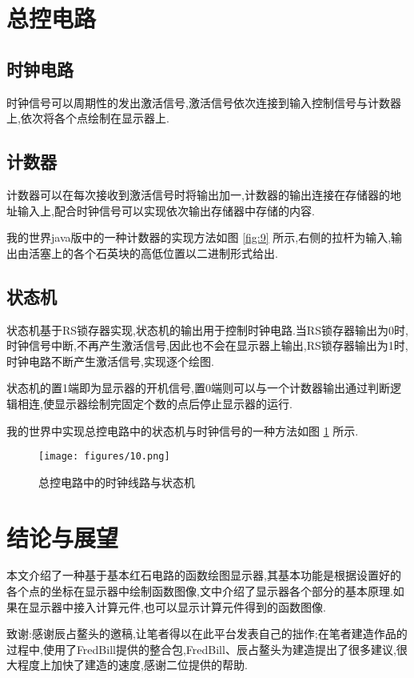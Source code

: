 \documentclass[UTF8,12pt,punct=kaiming,fontset=none]{ctexart}
\begin{document}
\section{总控电路}
\subsection{时钟电路}
时钟信号可以周期性的发出激活信号,激活信号依次连接到输入控制信号与计数器上,依次将各个点绘制在显示器上.

\subsection{计数器}
计数器可以在每次接收到激活信号时将输出加一,计数器的输出连接在存储器的地址输入上,配合时钟信号可以实现依次输出存储器中存储的内容.

我的世界java版中的一种计数器的实现方法如图 \ref{fig:9} 所示,右侧的拉杆为输入,输出由活塞上的各个石英块的高低位置以二进制形式给出.

\subsection{状态机}
状态机基于RS锁存器实现,状态机的输出用于控制时钟电路.当RS锁存器输出为0时,时钟信号中断,不再产生激活信号,因此也不会在显示器上输出,RS锁存器输出为1时,时钟电路不断产生激活信号,实现逐个绘图.

状态机的置1端即为显示器的开机信号,置0端则可以与一个计数器输出通过判断逻辑相连,使显示器绘制完固定个数的点后停止显示器的运行.

我的世界中实现总控电路中的状态机与时钟信号的一种方法如图 \ref{fig:10} 所示.

\begin{figure}[H]
    \centering
    \texttt{[image: figures/10.png]}
    \caption{总控电路中的时钟线路与状态机}
    \label{fig:10}
\end{figure}

\section{结论与展望}
本文介绍了一种基于基本红石电路的函数绘图显示器,其基本功能是根据设置好的各个点的坐标在显示器中绘制函数图像,文中介绍了显示器各个部分的基本原理.如果在显示器中接入计算元件,也可以显示计算元件得到的函数图像.

致谢:感谢辰占鳌头的邀稿,让笔者得以在此平台发表自己的拙作;在笔者建造作品的过程中,使用了FredBill提供的整合包,FredBill、辰占鳌头为建造提出了很多建议,很大程度上加快了建造的速度,感谢二位提供的帮助.



\end{document}
